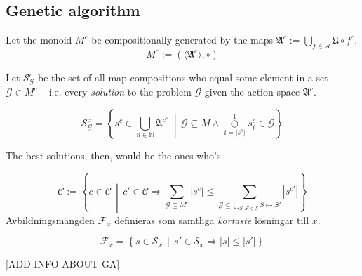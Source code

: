 \documentclass[10pt,a4paper]{article}
\begin{document}
\subsection{Genetic algorithm}
Let the monoid \(M^c\) be compositionally generated by the maps \(\mathfrak{A}^c := \bigcup_{f\in\mathcal{A}} \mathfrak{U}\circ f^c\).
\begin{equation}
		M^c:=\left(\langle\mathfrak{A}^c\rangle,\circ\right)
\end{equation}

Let \(\mathscr{S}^c_\mathcal{G}\) be the set of all map-compositions who equal some element in a set \(\mathcal{G}\in M^c\) -- i.e. every \textit{solution} to the problem \(\mathcal{G}\) given the action-space \(\mathfrak{A}^c\).

\begin{equation}
		\mathscr{S}^c_\mathcal{G} = \left\{ s^c \in \bigcup_{n\in \mathbb{N}}\mathfrak{A}^{c^n} \,\middle|\, \mathcal{G}\subseteq M\wedge\overset{1}{\underset{i=|s^c|}\bigcirc} s^c_i \in \mathcal{G} \right\}
\end{equation}


The best solutions, then, would be the ones who's 

\begin{equation}
		\mathscr{C} := \left\{ c \in \mathcal{C} \,\middle|\, c'\in\mathcal{C} \Rightarrow \sum_{\mathcal{G}\subseteq M^c} \left|s^{c}\right| \le \sum_{\mathcal{G}\subseteq \underset {S,S'\in\mathcal{S}} \bigcup S\mapsto S'} \left|s^{c'}\right| \right\}
\end{equation}
Avbildningsmängden \(\mathscr{F}_x\) definieras som samtliga \textit{kortaste} lösningar till \(x\).

\begin{equation}
		\mathscr{F}_x=\left\{s\in\mathscr{S}_x \,\middle|\, s'\in \mathscr{S}_x \Rightarrow |s|\le|s'|\right\}
\end{equation}

[ADD INFO ABOUT GA]
\end{document}
